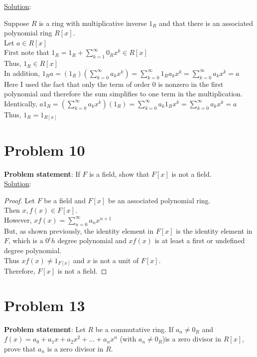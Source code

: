 \documentclass{article} %
\begin{document}
\underline{Solution}: 
\begin{addmargin}[1em]{0em}
Suppose $R$ is a ring with multiplicative inverse $1_R$ and that there is an associated polynomial ring $R[x]$.
\\Let $a \in R[x]$
\\First note that $1_R = 1_R + \sum_{k=1}^{\infty}{0_Rx^k} \in R[x]$
\\Thus, $1_R \in R[x]$
\\In addition, $1_Ra = (1_R)(\sum_{k=0}^{\infty}{a_kx^k}) = \sum_{k=0}^{\infty}{1_Ra_kx^k} = \sum_{k=0}^{\infty}{a_kx^k} = a$
\\Here I used the fact that only the term of order $0$ is nonzero in the first polynomial and therefore the sum simplifies to one term in the multiplication.
\\Identically, $a1_R = (\sum_{k=0}^{\infty}{a_kx^k})(1_R) = \sum_{k=0}^{\infty}{a_k1_Rx^k} = \sum_{k=0}^{\infty}{a_kx^k} = a$
\\Thus, $1_R = 1_{R[x]}$
\end{addmargin}
\newpage
\section*{Problem 10}
\textbf{Problem statement}: If $F$ is a field, show that $F[x]$ is not a field.
\\

\underline{Solution}: 
\begin{addmargin}[1em]{0em}
\begin{proof}
Let $F$ be a field and $F[x]$ be an associated polynomial ring.
\\Then $x, f(x) \in F[x]$.
\\However, $xf(x) = \sum_{n=0}^{\infty}a_nx^{n+1}$
\\But, as shown previously, the identity element in $F[x]$ is the identity element in $F$, which is a 0$^th$ degree polynomial and $xf(x)$ is at least a first or undefined degree polynomial.
\\Thus $xf(x) \neq 1_{F[x]}$ and $x$ is not a unit of $F[x]$.
\\Therefore, $F[x]$ is not a field.
\end{proof}
\end{addmargin}
\newpage
\section*{Problem 13}
\textbf{Problem statement}: Let $R$ be a commutative ring.  If $a_n \neq 0_R$ and $f(x) = a_0 + a_1x + a_2x^2 + ... + a_nx^n$ (with $a_n \neq 0_R$)is a zero divisor in $R[x]$, prove that $a_n$ is a zero divisor in $R$.
\\
\end{document}
